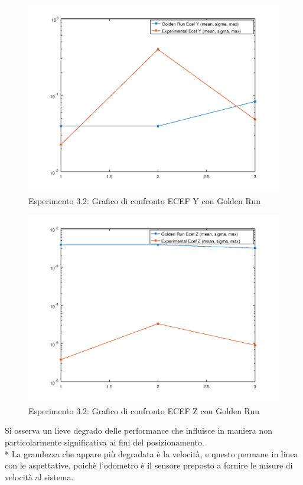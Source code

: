 \begin{figure}[h]
	\centering
	\includegraphics[width=0.7\linewidth]{img/exp12ecefY}
	\caption{Esperimento 3.2: Grafico di confronto ECEF Y con Golden Run}
\end{figure}
\begin{figure}[h]
	\centering
	\includegraphics[width=0.7\linewidth]{img/exp12ecefZ}
	\caption{Esperimento 3.2: Grafico di confronto ECEF Z con Golden Run}
\end{figure}
\FloatBarrier
Si osserva un lieve degrado delle performance che influisce in maniera non particolarmente significativa ai fini del posizionamento.\\*
La grandezza che appare pi\`u degradata \`e la velocit\`a, e questo permane in linea con le aspettative, poich\`e l'odometro \`e il sensore preposto a fornire le misure di velocit\`a al sistema.
